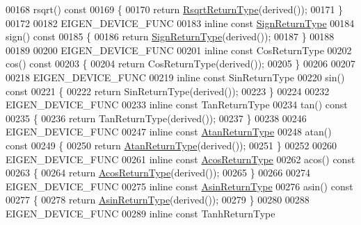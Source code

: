 \begin{DoxyCode}
00168 rsqrt()\textcolor{keyword}{ const}
00169 \textcolor{keyword}{}\{
00170   \textcolor{keywordflow}{return} \hyperlink{group___core___module_class_eigen_1_1_cwise_unary_op}{RsqrtReturnType}(derived());
00171 \}
00172 
00182 EIGEN\_DEVICE\_FUNC
00183 \textcolor{keyword}{inline} \textcolor{keyword}{const} \hyperlink{group___core___module_class_eigen_1_1_cwise_unary_op}{SignReturnType}
00184 sign()\textcolor{keyword}{ const}
00185 \textcolor{keyword}{}\{
00186   \textcolor{keywordflow}{return} \hyperlink{group___core___module_class_eigen_1_1_cwise_unary_op}{SignReturnType}(derived());
00187 \}
00188 
00189 
00200 EIGEN\_DEVICE\_FUNC
00201 \textcolor{keyword}{inline} \textcolor{keyword}{const} CosReturnType
00202 cos()\textcolor{keyword}{ const}
00203 \textcolor{keyword}{}\{
00204   \textcolor{keywordflow}{return} CosReturnType(derived());
00205 \}
00206 
00207 
00218 EIGEN\_DEVICE\_FUNC
00219 \textcolor{keyword}{inline} \textcolor{keyword}{const} SinReturnType
00220 sin()\textcolor{keyword}{ const}
00221 \textcolor{keyword}{}\{
00222   \textcolor{keywordflow}{return} SinReturnType(derived());
00223 \}
00224 
00232 EIGEN\_DEVICE\_FUNC
00233 \textcolor{keyword}{inline} \textcolor{keyword}{const} TanReturnType
00234 tan()\textcolor{keyword}{ const}
00235 \textcolor{keyword}{}\{
00236   \textcolor{keywordflow}{return} TanReturnType(derived());
00237 \}
00238 
00246 EIGEN\_DEVICE\_FUNC
00247 \textcolor{keyword}{inline} \textcolor{keyword}{const} \hyperlink{group___core___module_class_eigen_1_1_cwise_unary_op}{AtanReturnType}
00248 atan()\textcolor{keyword}{ const}
00249 \textcolor{keyword}{}\{
00250   \textcolor{keywordflow}{return} \hyperlink{group___core___module_class_eigen_1_1_cwise_unary_op}{AtanReturnType}(derived());
00251 \}
00252 
00260 EIGEN\_DEVICE\_FUNC
00261 \textcolor{keyword}{inline} \textcolor{keyword}{const} \hyperlink{group___core___module_class_eigen_1_1_cwise_unary_op}{AcosReturnType}
00262 acos()\textcolor{keyword}{ const}
00263 \textcolor{keyword}{}\{
00264   \textcolor{keywordflow}{return} \hyperlink{group___core___module_class_eigen_1_1_cwise_unary_op}{AcosReturnType}(derived());
00265 \}
00266 
00274 EIGEN\_DEVICE\_FUNC
00275 \textcolor{keyword}{inline} \textcolor{keyword}{const} \hyperlink{group___core___module_class_eigen_1_1_cwise_unary_op}{AsinReturnType}
00276 asin()\textcolor{keyword}{ const}
00277 \textcolor{keyword}{}\{
00278   \textcolor{keywordflow}{return} \hyperlink{group___core___module_class_eigen_1_1_cwise_unary_op}{AsinReturnType}(derived());
00279 \}
00280 
00288 EIGEN\_DEVICE\_FUNC
00289 \textcolor{keyword}{inline} \textcolor{keyword}{const} TanhReturnType

\end{DoxyCode}
